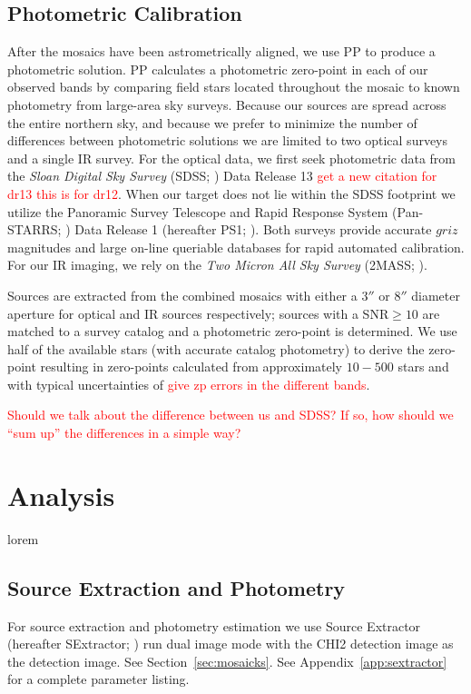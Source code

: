 \documentclass[apj, revtex4]{emulateapj}
\newcommand{\editorial}[1]{\textcolor{red}{#1}}
\begin{document}
\subsection{Photometric Calibration}
After the mosaics have been astrometrically aligned, we use PP to produce a photometric solution. PP calculates a photometric zero-point in each of our observed bands by comparing field stars located throughout the mosaic to known photometry from large-area sky surveys. Because our sources are spread across the entire northern sky, and because we prefer to minimize the number of differences between photometric solutions we are limited to two optical surveys and a single IR survey. For the optical data, we first seek photometric data from the \textit{Sloan Digital Sky Survey} (SDSS; \citealt{York2000}) Data Release 13 \citep{Alam2015} \editorial{get a new citation for dr13 this is for dr12}. When our target does not lie within the SDSS footprint we utilize the Panoramic Survey Telescope and Rapid Response System (Pan-STARRS; \citealt{Chambers2016}) Data Release 1 (hereafter PS1; \citealt{Flewelling2016}). Both surveys provide accurate $griz$ magnitudes and large on-line queriable databases for rapid automated calibration. For our IR imaging, we rely on the \textit{Two Micron All Sky Survey} (2MASS; \citealt{Skrutskie2006}).

Sources are extracted from the combined mosaics with either a $3''$ or $8''$ diameter aperture for optical and IR sources respectively; sources with a SNR$\ge10$ are matched to a survey catalog and a photometric zero-point is determined. We use half of the available stars (with accurate catalog photometry) to derive the zero-point resulting in zero-points calculated from approximately $10-500$ stars and with typical uncertainties of \editorial{give zp errors in the different bands}.

\editorial{Should we talk about the difference between us and SDSS? If so, how should we ``sum up'' the differences in a simple way?} 

\section{Analysis}\label{sec:analysis}
lorem

\subsection{Source Extraction and Photometry}
For source extraction and photometry estimation we use Source Extractor (hereafter SExtractor; \citealt{Bertin1996}) run dual image mode with the CHI2 detection image as the detection image. See Section~\ref{sec:mosaicks}. See Appendix~\ref{app:sextractor} for a complete parameter listing.
\end{document}
